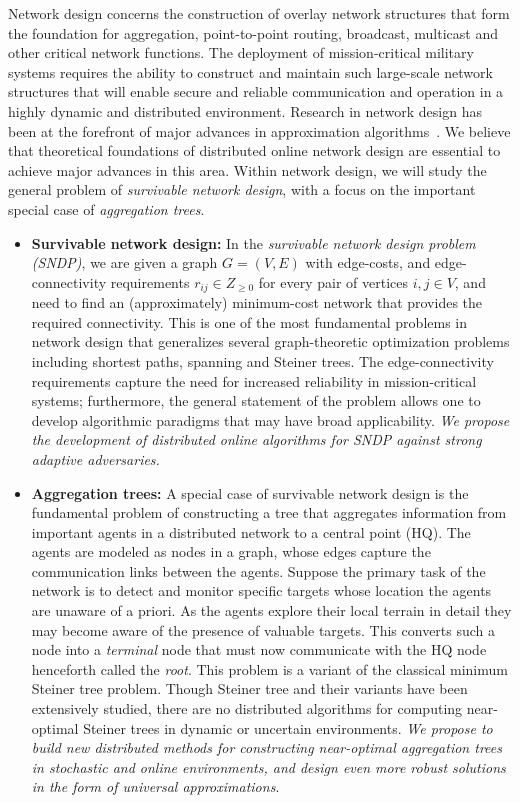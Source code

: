 Network design concerns the construction of
overlay network structures that form the foundation for aggregation,
point-to-point routing, broadcast, multicast and other critical
network functions.  The deployment of mission-critical military
systems requires the ability to construct and maintain such
large-scale network structures that will enable secure and reliable
communication and operation in a highly dynamic and distributed
environment.  Research in network design has been at the forefront of
major advances in approximation algorithms~\cite{SWbook}.  We believe that
theoretical foundations of distributed online network design are
essential to achieve major advances in this area.  Within network
design, we will study the general problem of {\em survivable network
design}, with a focus on the important special case of {\em
aggregation trees}.

\begin{itemize}
\item
{\bf Survivable network design:} In the {\em survivable network design
  problem (SNDP)}, we are given a graph $G = (V,E)$ with edge-costs,
and edge-connectivity requirements $r_{ij} \in Z_{\ge 0}$ for every
pair of vertices $i, j \in V$, and need to find an (approximately)
minimum-cost network that provides the required connectivity.  This is
one of the most fundamental problems in network design that
generalizes several graph-theoretic optimization problems including
shortest paths, spanning and Steiner trees.  The edge-connectivity
requirements capture the need for increased reliability in
mission-critical systems; furthermore, the general statement of the
problem allows one to develop algorithmic paradigms that may have
broad applicability. {\em We propose the development of distributed
  online algorithms for SNDP against strong adaptive adversaries.}

\item
{\bf Aggregation trees:} A special case of survivable network design
is the fundamental problem of constructing a tree that aggregates
information from important agents in a distributed network to a
central point (HQ). The agents are modeled as nodes in a graph, whose
edges capture the communication links between the agents.  Suppose the
primary task of the network is to detect and monitor specific targets
whose location the agents are unaware of a priori.  As the agents
explore their local terrain in detail they may become aware of the
presence of valuable targets. This converts such a node into a {\em
  terminal} node that must now communicate with the HQ node henceforth
called the {\em root}.  This problem is a variant of the classical
minimum Steiner tree problem.  Though Steiner tree and their variants
have been extensively studied, there are no distributed algorithms for
computing near-optimal Steiner trees in dynamic or uncertain
environments.  {\em We propose to build new distributed methods for
  constructing near-optimal aggregation trees in stochastic and online
  environments, and design even more robust solutions in the form of
  universal approximations}.
\end{itemize}

